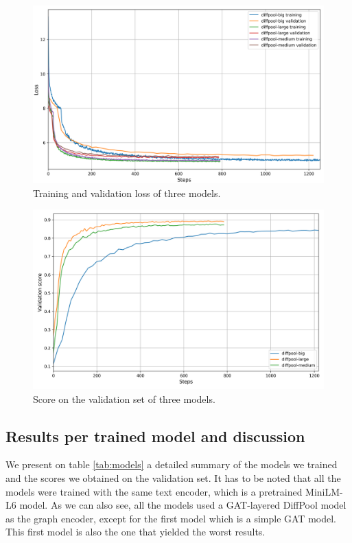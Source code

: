 \documentclass[switch, 11pt]{article}
\begin{document}
\begin{multicols}{2}

    \begin{figure}[H]
        \centering
        \includegraphics[width=0.8\columnwidth]{figures/loss.png}
        \caption{Training and validation loss of three models.}
        \label{fig:loss}
    \end{figure}
    \begin{figure}[H]
        \centering
        \includegraphics[width=0.8\columnwidth]{figures/score.png}
        \caption{Score on the validation set of three models.}
        \label{fig:score}
    \end{figure}

    \subsection{Results per trained model and discussion}

    We present on table \ref{tab:models} a detailed summary of the models we trained and the scores we obtained on the validation set. It has to be noted that all the models were trained with the same text encoder, which is a pretrained MiniLM-L6 model. As we can also see, all the models used a GAT-layered DiffPool model as the graph encoder, except for the first model which is a simple GAT model. This first model is also the one that yielded the worst results.


\end{multicols}
\end{document}
